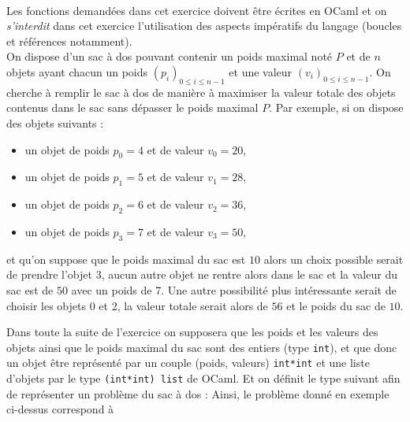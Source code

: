 \documentclass[11pt,a4paper]{article}
\begin{document}
\begin{Exercise}[title={Problème du sac à dos}]\\
Les fonctions demandées dans cet exercice doivent être écrites en OCaml et on \textit{s'interdit} dans cet exercice l'utilisation des aspects impératifs du langage (boucles et références notamment).\\
On dispose d'un sac à dos pouvant contenir un poids maximal noté $P$ et de $n$ objets ayant chacun un poids $\left(p_i\right)_{0\leqslant i \leqslant n-1}$ et une valeur $\left(v_i\right)_{0\leqslant i \leqslant n-1}$. On cherche à remplir le sac à dos de manière à maximiser la valeur totale des objets contenus dans le sac sans dépasser le poids maximal $P$.
Par exemple, si on dispose des objets suivants :
\begin{itemize}
	\item un objet de poids $p_0 = 4$ et de valeur $v_0 = 20$,
	\item un objet de poids $p_1 = 5$ et de valeur $v_1 = 28$,
	\item un objet de poids $p_2 = 6$ et de valeur $v_2 = 36$,
	\item un objet de poids $p_3 = 7$ et de valeur $v_3 = 50$,
\end{itemize}
et qu'on suppose que le poids maximal du sac est $10$ alors un choix possible serait de prendre l'objet 3, aucun autre objet ne rentre alors dans le sac et la valeur du sac est  de $50$ avec un poids de 7. Une autre possibilité plus intéressante serait de choisir les objets 0  et 2, la valeur totale serait alors de $56$ et le poids du sac de $10$.\smallskip

Dans toute la suite de l'exercice on supposera que les poids et les valeurs des objets ainsi que le poids maximal du sac sont des entiers (type {\tt int}), et que donc un objet  être représenté par un couple (poids, valeurs) {\tt int*int} et une liste d'objets par le type {\tt (int*int) list} de OCaml. Et on définit le type suivant afin de représenter un problème du sac à dos :
Ainsi, le problème donné en exemple ci-dessus correspond à



\end{Exercise}
\end{document}
